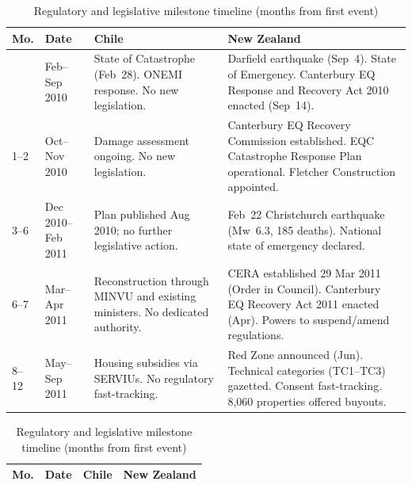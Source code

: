 \documentclass[12pt]{article}
\begin{document}
\begin{table}[!htbp]
\centering
\caption{Regulatory and legislative milestone timeline (months from first event)}
\label{tab:regmilestones}
\footnotesize
\begin{tabular}{@{}
  >{\raggedright\arraybackslash}p{}
  >{\raggedright\arraybackslash}p{}
  >{\raggedright\arraybackslash}p{}
  >{\raggedright\arraybackslash}p{}
@{}}
\toprule
\textbf{Mo.} &
\textbf{Date} &
\textbf{Chile} &
\textbf{New Zealand} \\
\midrule

{0} & Feb--Sep 2010 &
State of Catastrophe (Feb~28). ONEMI response. No new legislation. &
Darfield earthquake (Sep~4). State of Emergency. Canterbury EQ Response and Recovery Act 2010 enacted (Sep~14). \\
\addlinespace

{1--2} & Oct--Nov 2010 &
Damage assessment ongoing. No new legislation. &
Canterbury EQ Recovery Commission established. EQC Catastrophe Response Plan operational. Fletcher Construction appointed. \\
\addlinespace

{3--6} & Dec 2010--Feb 2011 &
Plan published Aug 2010; no further legislative action. &
Feb~22 Christchurch earthquake (Mw~6.3, 185 deaths). National state of emergency declared. \\
\addlinespace

{6--7} & Mar--Apr 2011 &
Reconstruction through MINVU and existing ministers. No dedicated authority. &
CERA established 29 Mar 2011 (Order in Council). Canterbury EQ Recovery Act 2011 enacted (Apr). Powers to suspend/amend regulations. \\
\addlinespace

{8--12} & May--Sep 2011 &
Housing subsidies via SERVIUs. No regulatory fast-tracking. &
Red Zone announced (Jun). Technical categories (TC1--TC3) gazetted. Consent fast-tracking. 8,060 properties offered buyouts. \\

\end{tabular}

\centering
\footnotesize
\begin{tabular}{@{}
  >{\raggedright\arraybackslash}p{}
  >{\raggedright\arraybackslash}p{}
  >{\raggedright\arraybackslash}p{}
  >{\raggedright\arraybackslash}p{}
@{}}
\toprule
\textbf{Mo.} &
\textbf{Date} &
\textbf{Chile} &
\textbf{New Zealand} \\
\midrule


\end{tabular}
\end{table}
\end{document}
